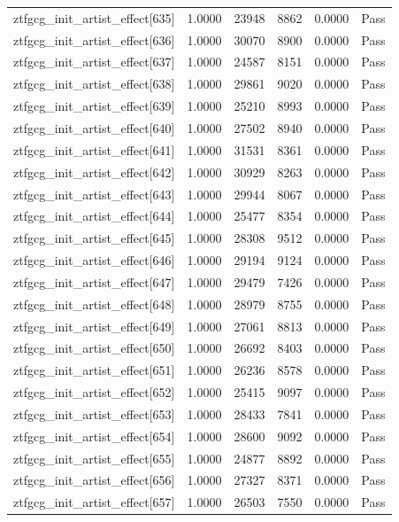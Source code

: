\begin{table}[htbp]
\begin{tabular}{llrrll}
ztfgcg\_init\_artist\_effect[635] & 1.0000 & 23948 & 8862 & 0.0000 & Pass \\
ztfgcg\_init\_artist\_effect[636] & 1.0000 & 30070 & 8900 & 0.0000 & Pass \\
ztfgcg\_init\_artist\_effect[637] & 1.0000 & 24587 & 8151 & 0.0000 & Pass \\
ztfgcg\_init\_artist\_effect[638] & 1.0000 & 29861 & 9020 & 0.0000 & Pass \\
ztfgcg\_init\_artist\_effect[639] & 1.0000 & 25210 & 8993 & 0.0000 & Pass \\
ztfgcg\_init\_artist\_effect[640] & 1.0000 & 27502 & 8940 & 0.0000 & Pass \\
ztfgcg\_init\_artist\_effect[641] & 1.0000 & 31531 & 8361 & 0.0000 & Pass \\
ztfgcg\_init\_artist\_effect[642] & 1.0000 & 30929 & 8263 & 0.0000 & Pass \\
ztfgcg\_init\_artist\_effect[643] & 1.0000 & 29944 & 8067 & 0.0000 & Pass \\
ztfgcg\_init\_artist\_effect[644] & 1.0000 & 25477 & 8354 & 0.0000 & Pass \\
ztfgcg\_init\_artist\_effect[645] & 1.0000 & 28308 & 9512 & 0.0000 & Pass \\
ztfgcg\_init\_artist\_effect[646] & 1.0000 & 29194 & 9124 & 0.0000 & Pass \\
ztfgcg\_init\_artist\_effect[647] & 1.0000 & 29479 & 7426 & 0.0000 & Pass \\
ztfgcg\_init\_artist\_effect[648] & 1.0000 & 28979 & 8755 & 0.0000 & Pass \\
ztfgcg\_init\_artist\_effect[649] & 1.0000 & 27061 & 8813 & 0.0000 & Pass \\
ztfgcg\_init\_artist\_effect[650] & 1.0000 & 26692 & 8403 & 0.0000 & Pass \\
ztfgcg\_init\_artist\_effect[651] & 1.0000 & 26236 & 8578 & 0.0000 & Pass \\
ztfgcg\_init\_artist\_effect[652] & 1.0000 & 25415 & 9097 & 0.0000 & Pass \\
ztfgcg\_init\_artist\_effect[653] & 1.0000 & 28433 & 7841 & 0.0000 & Pass \\
ztfgcg\_init\_artist\_effect[654] & 1.0000 & 28600 & 9092 & 0.0000 & Pass \\
ztfgcg\_init\_artist\_effect[655] & 1.0000 & 24877 & 8892 & 0.0000 & Pass \\
ztfgcg\_init\_artist\_effect[656] & 1.0000 & 27327 & 8371 & 0.0000 & Pass \\
ztfgcg\_init\_artist\_effect[657] & 1.0000 & 26503 & 7550 & 0.0000 & Pass \\

\end{tabular}
\end{table}
